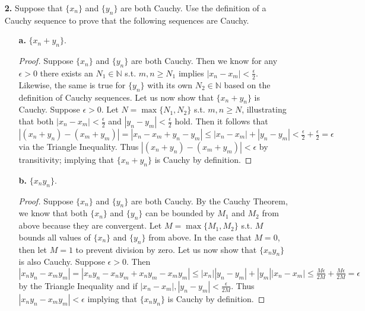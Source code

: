 \documentclass[ 12pt ]{article}
\begin{document}
\begin{enumerate}
\begin{proof}
		By the Monotone Convergence Theorem, in all cases of the value $x_0$, $x_n$ converges because it is either increasing or decreasing and bounded by $1$
		from above or below respectively. Additionally, $a = \lim_{n \rightarrow \infty} x_n = \lim_{n \rightarrow \infty} \frac{1 + x_{n-1}}{2} =
		\frac{1 + \lim_{n \rightarrow \infty} x_{n-1}}{2} = \frac{1 + a}{2}$ via Limit Laws (i) and (iv) as well as Lemma (i). Moreover, $a = \frac{1 + a}{2}$
		implies that $a=1$.
	\end{proof}


	\item[\textbf{2.}] Suppose that $\{x_n\}$ and $\{y_n\}$ are both Cauchy. Use the definition of a Cauchy sequence to prove that the following sequences are
		Cauchy.

	\begin{enumerate}
		\item[\textbf{a.}] $\{x_n + y_n\}$.

		\begin{proof}
			Suppose $\{x_n\}$ and $\{y_n\}$ are both Cauchy. Then we know for any $\epsilon > 0$ there exists an $N_1 \in \mathbb{N}$ s.t. $m,n \geq N_1$ implies
			$|x_n - x_m| < \frac{\epsilon}{2}$. Likewise, the same is true for $\{y_n\}$ with its own $N_2 \in \mathbb{N}$ based on the definition of Cauchy
			sequences. Let us now show that $\{x_n + y_n\}$ is Cauchy. Suppose $\epsilon > 0$. Let $N = \max\{N_1, N_2\}$ s.t. $m,n \geq N$, illustrating that
			both $|x_n - x_m| < \frac{\epsilon}{2}$ and $|y_n - y_m| < \frac{\epsilon}{2}$ hold. Then it follows that $|(x_n + y_n) - (x_m + y_m)| =
			|x_n - x_m + y_n - y_m| \leq |x_n - x_m| + |y_n - y_m| < \frac{\epsilon}{2} + \frac{\epsilon}{2} = \epsilon$ via the Triangle Inequality. Thus
			$|(x_n + y_n) - (x_m + y_m)| < \epsilon$ by transitivity; implying that $\{x_n + y_n\}$ is Cauchy by definition.
		\end{proof}


		\item[\textbf{b.}] $\{x_n y_n\}$.

		\begin{proof}
			Suppose $\{x_n\}$ and $\{y_n\}$ are both Cauchy. By the Cauchy Theorem, we know that both $\{x_n\}$ and $\{y_n\}$ can be bounded by $M_1$ and $M_2$ from above because they are convergent.
			Let $M = \max\{M_1, M_2\}$ s.t. $M$ bounds all values of $\{x_n\}$ and $\{y_n\}$ from above. In the case that $M = 0$, then let $M = 1$ to prevent division by zero. Let us now show that $\{x_n y_n\}$
			is also Cauchy. Suppose $\epsilon > 0$. Then $|x_n y_n - x_m y_m| = |x_n y_n  - x_n y_m + x_n y_m - x_m y_m| \leq |x_n||y_n - y_m| + |y_m||x_n - x_m| \leq
			\frac{M \epsilon}{2M} + \frac{M \epsilon}{2M} = \epsilon$ by the Triangle Inequality and if $|x_n - x_m|, |y_n - y_m| < \frac{\epsilon}{2M}$. Thus
			$|x_n y_n - x_m y_m| < \epsilon$ implying that $\{x_n y_n\}$ is Cauchy by definition.
		\end{proof}
	\end{enumerate}



\end{enumerate}
\end{document}
